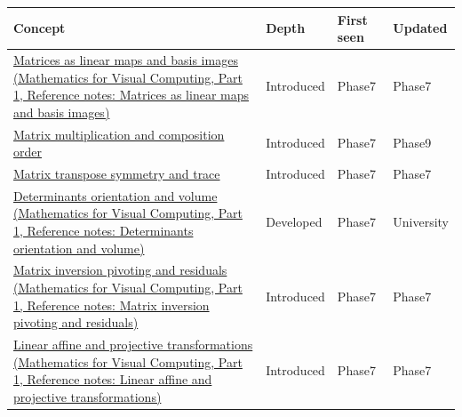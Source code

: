 {\def\LTcaptype{none} %
\begin{longtable}[]{@{}
  >{\raggedright\arraybackslash}p{}
  >{\raggedright\arraybackslash}p{}
  >{\raggedright\arraybackslash}p{}
  >{\raggedright\arraybackslash}p{}@{}}
\toprule\noalign{}
\begin{minipage}[b]{\linewidth}\raggedright
Concept
\end{minipage} & \begin{minipage}[b]{\linewidth}\raggedright
Depth
\end{minipage} & \begin{minipage}[b]{\linewidth}\raggedright
First seen
\end{minipage} & \begin{minipage}[b]{\linewidth}\raggedright
Updated
\end{minipage} \\
\midrule\noalign{}
\endhead
\bottomrule\noalign{}
\endlastfoot
\href{../02-Mathematics-for-Visual-Computing-P01/main.pdf\#appendix-bd39c3bf5d64}{Matrices as linear maps and basis images (Mathematics for Visual Computing, Part 1, Reference notes: Matrices as linear maps and basis images)} & Introduced & Phase7 & Phase7 \\
\hyperref[appendix-ab31ef447dbf]{Matrix multiplication and composition order} & Introduced & Phase7 & Phase9 \\
\hyperref[appendix-175ca5ff874d]{Matrix transpose symmetry and trace} & Introduced & Phase7 & Phase7 \\
\href{../02-Mathematics-for-Visual-Computing-P01/main.pdf\#appendix-da478be01d02}{Determinants orientation and volume (Mathematics for Visual Computing, Part 1, Reference notes: Determinants orientation and volume)} & Developed & Phase7 & University \\
\href{../02-Mathematics-for-Visual-Computing-P01/main.pdf\#appendix-48d2e66378ab}{Matrix inversion pivoting and residuals (Mathematics for Visual Computing, Part 1, Reference notes: Matrix inversion pivoting and residuals)} & Introduced & Phase7 & Phase7 \\
\href{../02-Mathematics-for-Visual-Computing-P01/main.pdf\#appendix-0bf0ca73f735}{Linear affine and projective transformations (Mathematics for Visual Computing, Part 1, Reference notes: Linear affine and projective transformations)} & Introduced & Phase7 & Phase7 \\

\end{longtable}}
